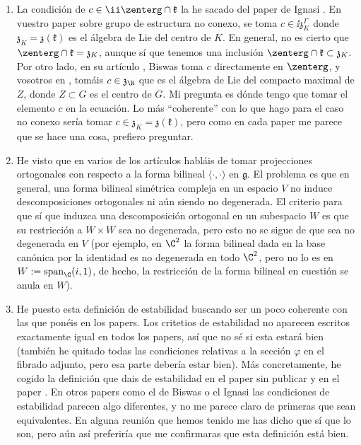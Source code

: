 {\begin{enumerate}
    \item[\textbf{(6)}] La condición de \(c \in \ii \zenterg \cap \mathfrak{k}\) la he sacado del paper de Ignasi \parencite{i1999hitchin}. En vuestro paper sobre grupo de estructura no conexo, se toma \(c \in \ii \mathfrak{z}_K^\Gamma\) donde \(\mathfrak{z}_K=\mathfrak{z}(\mathfrak{k})\) es el álgebra de Lie del centro de \(K\). En general, no es cierto que \(\zenterg \cap \mathfrak{k}=\mathfrak{z}_K\), aunque sí que tenemos una inclusión \(\zenterg \cap \mathfrak{k}\subset \mathfrak{z}_K\).  Por otro lado, en su artículo \parencite{anchouche2001einstein}, Biswas toma \(c\) directamente en \(\zenterg\), y vosotros en \parencite{garcia2009hitchin}, tomáis \(c \in \mathfrak{z}_\R\) que es el álgebra de Lie del compacto maximal de \(Z\), donde \(Z \subset G\) es el centro de \(G\). Mi pregunta es dónde tengo que tomar el elemento \(c\) en la ecuación. Lo más ``coherente'' con lo que hago para el caso no conexo sería tomar \(c \in \mathfrak{z}_K=\mathfrak{z}(\mathfrak{k})\), pero como en cada paper me parece que se hace una cosa, prefiero preguntar.
    \item[\textbf{(7)}] He visto que en varios de los artículos habláis de tomar projecciones ortogonales con respecto a la forma bilineal \(\langle \cdot , \cdot \rangle\) en \(\mathfrak{g}\). El problema es que en general, una forma bilineal simétrica compleja en un espacio \(V\) no induce descomposiciones ortogonales ni aún siendo no degenerada. El criterio para que sí que induzca una descomposición ortogonal en un subespacio \(W\) es que su restricción a \(W \times W\) sea no degenerada, pero esto no se sigue de que sea no degenerada en \(V\)  (por ejemplo, en \(\C^2\) la forma bilineal dada en la base canónica por la identidad es no degenerada en todo \(\C^2\), pero no lo es en \(W:=\mathrm{span}_\C(i,1)\), de hecho, la restricción de la forma bilineal en cuestión se anula en \(W\)).
    \item[\textbf{(8)}] He puesto esta definición de estabilidad buscando ser un poco coherente con las que ponéis en los papers. Los critetios de estabilidad no aparecen escritos exactamente igual en todos los papers, así que no sé si esta estará bien (también he quitado todas las condiciones relativas a la sección \(\varphi\) en el fibrado adjunto, pero esa parte debería estar bien). Más concretamente, he cogido la definición que dais de estabilidad en el paper sin publicar y en el paper \parencite{garcia2009hitchin}. En otros papers como el de Biswas o el Ignasi las condiciones de estabilidad parecen algo diferentes, y no me parece claro de primeras que sean equivalentes. En alguna reunión que hemos tenido me has dicho que sí que lo son, pero aún así preferiría que me confirmaras que esta definición está bien.

\end{enumerate}}
